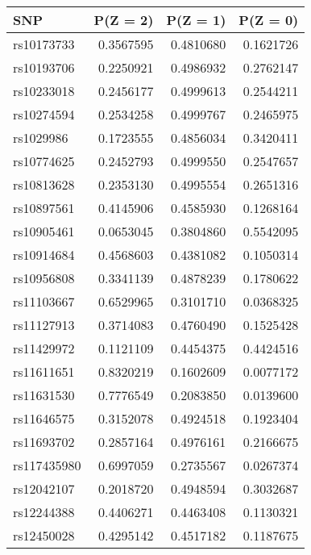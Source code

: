 \documentclass[
]{article}
\theoremstyle{plain}
\begin{document}
{\begin{table}[H]
  \caption{Table of the marginal distribution of instruments, $P(Z = z), z=0,1,2$, estimated after preprocessing for analysis in Section    \ref{smoking-effect-on-depression}}
  \label{tab:marginal-distribution-of-instruments-depression}
  \begin{minipage}{0.5\linewidth}
    \center
    \begin{table}[H]
\centering
\begin{tabular}{lrrr}
\toprule
SNP & P(Z = 2) & P(Z = 1) & P(Z = 0)\\
\midrule
rs10173733 & 0.3567595 & 0.4810680 & 0.1621726\\
rs10193706 & 0.2250921 & 0.4986932 & 0.2762147\\
rs10233018 & 0.2456177 & 0.4999613 & 0.2544211\\
rs10274594 & 0.2534258 & 0.4999767 & 0.2465975\\
rs1029986 & 0.1723555 & 0.4856034 & 0.3420411\\
\addlinespace
rs10774625 & 0.2452793 & 0.4999550 & 0.2547657\\
rs10813628 & 0.2353130 & 0.4995554 & 0.2651316\\
rs10897561 & 0.4145906 & 0.4585930 & 0.1268164\\
rs10905461 & 0.0653045 & 0.3804860 & 0.5542095\\
rs10914684 & 0.4568603 & 0.4381082 & 0.1050314\\
\addlinespace
rs10956808 & 0.3341139 & 0.4878239 & 0.1780622\\
rs11103667 & 0.6529965 & 0.3101710 & 0.0368325\\
rs11127913 & 0.3714083 & 0.4760490 & 0.1525428\\
rs11429972 & 0.1121109 & 0.4454375 & 0.4424516\\
rs11611651 & 0.8320219 & 0.1602609 & 0.0077172\\
\addlinespace
rs11631530 & 0.7776549 & 0.2083850 & 0.0139600\\
rs11646575 & 0.3152078 & 0.4924518 & 0.1923404\\
rs11693702 & 0.2857164 & 0.4976161 & 0.2166675\\
rs117435980 & 0.6997059 & 0.2735567 & 0.0267374\\
rs12042107 & 0.2018720 & 0.4948594 & 0.3032687\\
\addlinespace
rs12244388 & 0.4406271 & 0.4463408 & 0.1130321\\
rs12450028 & 0.4295142 & 0.4517182 & 0.1187675\\

\end{tabular}
\end{table}
\end{minipage}
\end{table}}
\end{document}
